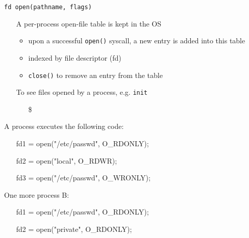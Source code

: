 \begin{frame}
  \begin{block}{\texttt{fd open(pathname, flags)}}
    \begin{itemize}
    \item[] A per-process \alert{open-file table} is kept in the OS
      \begin{itemize}
      \item upon a successful \texttt{open()} syscall, a new entry is added into this table
      \item indexed by \alert{file descriptor (fd)}
      \item \texttt{close()} to remove an entry from the table
      \end{itemize}
    \item[] To see files opened by a process, e.g. \texttt{init}
      \begin{itemize}
      \item[\$] 
      \end{itemize}
    \end{itemize}
  \end{block}
    \qquad{}
\end{frame}

\begin{frame}
  \begin{block}{A process executes the following code:}\ttfamily
    \begin{itemize}
    \item[] fd1 = open("/etc/passwd", O\_RDONLY);
    \item[] fd2 = open("local", O\_RDWR);
    \item[] fd3 = open("/etc/passwd", O\_WRONLY);
    \end{itemize}
  \end{block}
  \begin{center}
  \end{center}
\end{frame}

\begin{frame}
  \begin{block}{One more process B:}\ttfamily
    \begin{itemize}
    \item[] fd1 = open("/etc/passwd", O\_RDONLY);
    \item[] fd2 = open("private", O\_RDONLY);
    \end{itemize}
  \end{block}
  \begin{center}
  \end{center}
\end{frame}

